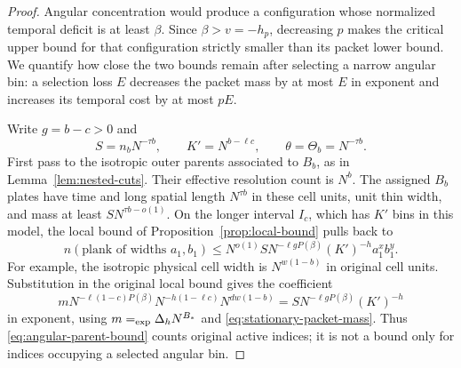\begin{proof}
Angular concentration would produce a configuration whose normalized
temporal deficit is at least $\beta$. Since $\beta>v=-h_p$, decreasing
$p$ makes the critical upper bound for that configuration strictly
smaller than its packet lower bound. We quantify how close the two
bounds remain after selecting a narrow angular bin: a selection loss
$E$ decreases the packet mass by at most $E$ in exponent and increases
its temporal cost by at most $pE$.

Write $g=b-c>0$ and
\[
 S=n_bN^{-\tau b},\qquad K'=N^{b-\ell c},
 \qquad\theta=\Theta_b=N^{-\tau b}.
\]
First pass to the isotropic outer parents associated to $B_b$, as in
Lemma~\ref{lem:nested-cuts}. Their effective resolution count is
$N^b$. The assigned $B_b$ plates have time and long spatial length
$N^{\tau b}$ in these cell units, unit thin width, and mass at least
$SN^{\tau b-o(1)}$. On the longer interval $I_c$, which has $K'$ bins
in this model, the local bound of Proposition~\ref{prop:local-bound}
pulls back to
\begin{equation}
 n(\text{plank of widths }a_1,b_1)
 \le N^{o(1)}
 S N^{-\ell gP(\beta)}(K')^{-h}a_1^xb_1^y.
\label{eq:angular-parent-bound}
\end{equation}
For example, the isotropic physical cell width is
$N^{w(1-b)}$ in original cell units. Substitution in the original
local bound gives the coefficient
\[
 mN^{-\ell(1-c)P(\beta)}N^{-h(1-\ell c)}
       N^{dw(1-b)}
 = S N^{-\ell gP(\beta)}(K')^{-h}
\]
in exponent, using $m\mathrel{=_{\mathrm{exp}}}\Delta_hN^{B_*}$ and
\eqref{eq:stationary-packet-mass}. Thus
\eqref{eq:angular-parent-bound} counts original active indices; it is
not a bound only for indices occupying a selected angular bin.


\end{proof}

